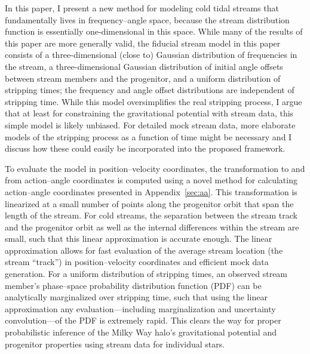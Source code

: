 \documentclass[12pt,preprint]{aastex}
\begin{document}
In this paper, I present a new method for modeling cold tidal streams
that fundamentally lives in frequency--angle space, because the stream
distribution function is essentially one-dimensional in this
space. While many of the results of this paper are more generally
valid, the fiducial stream model in this paper consists of a
three-dimensional (close to) Gaussian distribution of frequencies in
the stream, a three-dimensional Gaussian distribution of initial angle
offsets between stream members and the progenitor, and a uniform
distribution of stripping times; the frequency and angle offset
distributions are independent of stripping time. While this model
oversimplifies the real stripping process, I argue that at least for
constraining the gravitational potential with stream data, this simple
model is likely unbiased. For detailed mock stream data, more
elaborate models of the stripping process as a function of time might
be necessary and I discuss how these could easily be incorporated into
the proposed framework.

To evaluate the model in position--velocity coordinates, the
transformation to and from action--angle coordinates is computed using
a novel method for calculating action--angle coordinates presented in
Appendix~\ref{sec:aa}. This transformation is linearized at a small
number of points along the progenitor orbit that span the length of
the stream. For cold streams, the separation between the stream track
and the progenitor orbit as well as the internal differences within
the stream are small, such that this linear approximation is accurate
enough. The linear approximation allows for fast evaluation of the
average stream location (the stream ``track'') in position--velocity
coordinates and efficient mock data generation. For a uniform
distribution of stripping times, an observed stream member's
phase--space probability distribution function (PDF) can be
analytically marginalized over stripping time, such that using the
linear approximation any evaluation---including marginalization and
uncertainty convolution---of the PDF is extremely rapid. This clears
the way for proper probabilistic inference of the Milky Way halo's
gravitational potential and progenitor properties using stream data
for individual stars.
\end{document}
